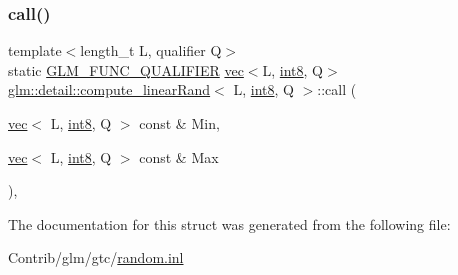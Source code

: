\subsubsection{\texorpdfstring{call()}{call()}}
{\footnotesize\ttfamily template$<$length\+\_\+t L, qualifier Q$>$ \\
static \mbox{\hyperlink{setup_8hpp_a33fdea6f91c5f834105f7415e2a64407}{G\+L\+M\+\_\+\+F\+U\+N\+C\+\_\+\+Q\+U\+A\+L\+I\+F\+I\+ER}} \mbox{\hyperlink{structglm_1_1vec}{vec}}$<$L, \mbox{\hyperlink{namespaceglm_1_1detail_a04b526a8d7a9b455602a0afa78c531e0}{int8}}, Q$>$ \mbox{\hyperlink{structglm_1_1detail_1_1compute__linear_rand}{glm\+::detail\+::compute\+\_\+linear\+Rand}}$<$ L, \mbox{\hyperlink{namespaceglm_1_1detail_a04b526a8d7a9b455602a0afa78c531e0}{int8}}, Q $>$\+::call (\begin{DoxyParamCaption}\item[{\mbox{\hyperlink{structglm_1_1vec}{vec}}$<$ L, \mbox{\hyperlink{namespaceglm_1_1detail_a04b526a8d7a9b455602a0afa78c531e0}{int8}}, Q $>$ const \&}]{Min,  }\item[{\mbox{\hyperlink{structglm_1_1vec}{vec}}$<$ L, \mbox{\hyperlink{namespaceglm_1_1detail_a04b526a8d7a9b455602a0afa78c531e0}{int8}}, Q $>$ const \&}]{Max }\end{DoxyParamCaption})\hspace{0.3cm}{\ttfamily [inline]}, {\ttfamily [static]}}



The documentation for this struct was generated from the following file\+:\begin{DoxyCompactItemize}
\item 
Contrib/glm/gtc/\mbox{\hyperlink{random_8inl}{random.\+inl}}\end{DoxyCompactItemize}
